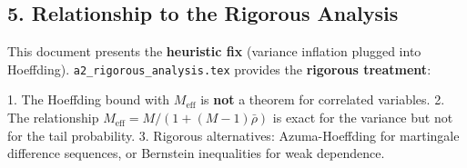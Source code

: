 \documentclass[
  12pt,
]{article}
\begin{document}
\subsection{5. Relationship to the Rigorous Analysis}\label{relationship-to-rigorous}

This document presents the \textbf{heuristic fix} (variance inflation plugged into Hoeffding). \texttt{a2\_rigorous\_analysis.tex} provides the \textbf{rigorous treatment}:

1. The Hoeffding bound with \(M_{\text{eff}}\) is \textbf{not} a theorem for correlated variables.
2. The relationship \(M_{\text{eff}} = M/(1+(M-1)\bar{\rho})\) is exact for the variance but not for the tail probability.
3. Rigorous alternatives: Azuma-Hoeffding for martingale difference sequences, or Bernstein inequalities for weak dependence.
\end{document}
